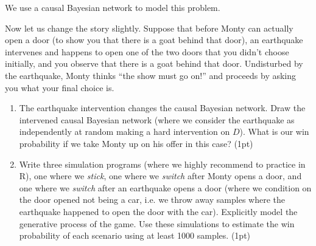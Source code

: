 We use a causal Bayesian network to model this problem.
Now let us change the story slightly. Suppose that before Monty can actually open a door (to show you that there is
a goat behind that door), an earthquake intervenes and happens to open one of the two doors that you didn't choose initially, and
you observe that there is a goat behind that door. Undisturbed by the earthquake, Monty thinks ``the show must go on!'' and proceeds
by asking you what your final choice is.
\begin{enumerate}[resume*]
  \item The earthquake intervention changes the causal Bayesian network. Draw the intervened causal Bayesian network (where we consider the earthquake as independently at random making a hard intervention on $D$). What is our win probability if we take Monty up on his offer in this case? (1pt)
  \item Write three simulation programs (where we highly recommend to practice in R), one where we \emph{stick}, one where we \emph{switch} after Monty opens a door, and one where we \emph{switch} after an earthquake opens a door (where we condition on the door opened not being a car, i.e. we throw away samples where the earthquake happened to open the door with the car). Explicitly model the generative process of the game. Use these simulations to estimate the win probability of each scenario using at least 1000 samples. (1pt)
\end{enumerate}

